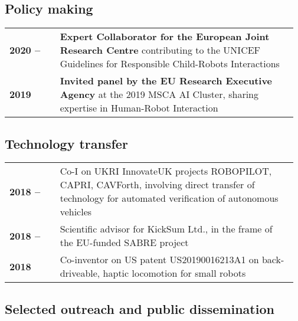 \subsection{Policy making}

\begin{tabular}{p{0.17\linewidth}p{0.8\linewidth}}
    \bf 2020 -- & {\bf Expert Collaborator for the European Joint Research Centre} contributing to the UNICEF Guidelines for Responsible Child-Robots Interactions \\
    \bf 2019  & {\bf Invited panel by the EU Research Executive Agency} at the 2019 MSCA AI Cluster, sharing expertise in Human-Robot Interaction \\
\end{tabular}

\subsection{Technology transfer}
\begin{tabular}{p{0.17\linewidth}p{0.8\linewidth}}
    \bf 2018 -- & Co-I on UKRI InnovateUK projects ROBOPILOT, CAPRI, CAVForth, involving direct transfer of technology for automated verification of autonomous vehicles \\
    \bf 2018 -- & Scientific advisor for KickSum Ltd., in the frame of the EU-funded SABRE project \\
    \bf 2018  & Co-inventor on US patent US20190016213A1 on back-driveable, haptic locomotion for small robots \\
\end{tabular}

\subsection{Selected outreach and public dissemination}

